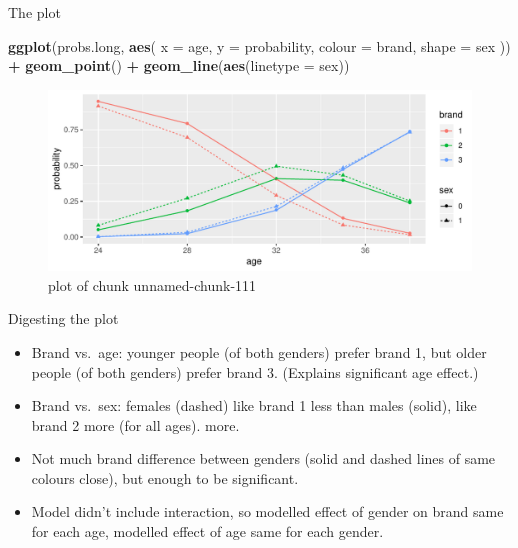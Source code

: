 \documentclass[ignorenonframetext,]{beamer}
\newenvironment{Shaded}{\begin{snugshade}}{\end{snugshade}}
\newcommand{\DataTypeTok}[1]{\textcolor[rgb]{0.13,0.29,0.53}{#1}}
\newcommand{\KeywordTok}[1]{\textcolor[rgb]{0.13,0.29,0.53}{\textbf{#1}}}
\newcommand{\NormalTok}[1]{#1}
\newcommand{\OperatorTok}[1]{\textcolor[rgb]{0.81,0.36,0.00}{\textbf{#1}}}
\newcommand{\StringTok}[1]{\textcolor[rgb]{0.31,0.60,0.02}{#1}}
\begin{document}
\begin{frame}[fragile]{The plot}
\protect\hypertarget{the-plot-1}{}

\begin{Shaded}
\begin{Highlighting}[]
\KeywordTok{ggplot}\NormalTok{(probs.long, }\KeywordTok{aes}\NormalTok{(}
  \DataTypeTok{x =}\NormalTok{ age, }\DataTypeTok{y =}\NormalTok{ probability,}
  \DataTypeTok{colour =}\NormalTok{ brand, }\DataTypeTok{shape =}\NormalTok{ sex}
\NormalTok{)) }\OperatorTok{+}
\StringTok{  }\KeywordTok{geom_point}\NormalTok{() }\OperatorTok{+}\StringTok{ }\KeywordTok{geom_line}\NormalTok{(}\KeywordTok{aes}\NormalTok{(}\DataTypeTok{linetype =}\NormalTok{ sex))}
\end{Highlighting}
\end{Shaded}

\begin{figure}
\centering
\includegraphics{figure/unnamed-chunk-111-1.pdf}
\caption{plot of chunk unnamed-chunk-111}
\end{figure}

\end{frame}

\begin{frame}{Digesting the plot}
\protect\hypertarget{digesting-the-plot}{}

\begin{itemize}
\item
  Brand vs.~age: younger people (of both genders) prefer brand 1, but
  older people (of both genders) prefer brand 3. (Explains significant
  age effect.)
\item
  Brand vs.~sex: females (dashed) like brand 1 less than males (solid),
  like brand 2 more (for all ages). more.
\item
  Not much brand difference between genders (solid and dashed lines of
  same colours close), but enough to be significant.
\item
  Model didn't include interaction, so modelled effect of gender on
  brand same for each age, modelled effect of age same for each gender.
\end{itemize}

\end{frame}
\end{document}
